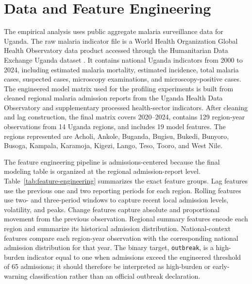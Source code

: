 \documentclass[11pt]{article}
\begin{document}
\section{Data and Feature Engineering}
The empirical analysis uses public aggregate malaria surveillance data for Uganda. The raw malaria indicator file is a World Health Organization Global Health Observatory data product accessed through the Humanitarian Data Exchange Uganda dataset \citep{ugandaWHOData}. It contains national Uganda indicators from 2000 to 2024, including estimated malaria mortality, estimated incidence, total malaria cases, suspected cases, microscopy examinations, and microscopy-positive cases. The engineered model matrix used for the profiling experiments is built from cleaned regional malaria admission reports from the Uganda Health Data Observatory \citep{MoHUganda2026} and supplementary processed health-sector indicators. After cleaning and lag construction, the final matrix covers 2020--2024, contains 129 region-year observations from 14 Uganda regions, and includes 19 model features. The regions represented are Acholi, Ankole, Buganda, Bugisu, Bukedi, Bunyoro, Busoga, Kampala, Karamoja, Kigezi, Lango, Teso, Tooro, and West Nile.

The feature engineering pipeline is admissions-centered because the final modeling table is organized at the regional admission-report level. Table~\ref{tab:feature-engineering} summarizes the exact feature groups. Lag features use the previous one and two reporting periods for each region. Rolling features use two- and three-period windows to capture recent local admission levels, volatility, and peaks. Change features capture absolute and proportional movement from the previous observation. Regional summary features encode each region and summarize its historical admission distribution. National-context features compare each region-year observation with the corresponding national admission distribution for that year. The binary target, \texttt{outbreak}, is a high-burden indicator equal to one when admissions exceed the engineered threshold of 65 admissions; it should therefore be interpreted as high-burden or early-warning classification rather than an official outbreak declaration.
\end{document}
